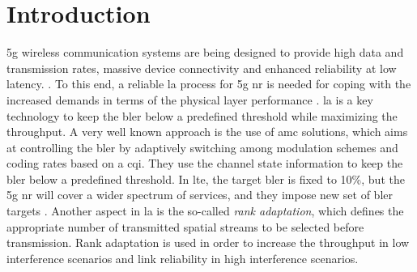 \glsresetall[\acronymtype]
%
\chapter{Introduction} \label{chp:introduction}
\Gls{5g} wireless communication systems are being designed to provide high data and transmission rates, massive device connectivity and enhanced reliability at low latency. \cite{Amin_2016}.
%
To this end, a reliable \gls{la} process for \gls{5g} \gls{nr} is needed for coping with the increased demands in terms of the physical layer performance \cite{chu01}.
%
\Gls{la} is a key technology to keep the \gls{bler} below a predefined threshold while maximizing the throughput.
%
%
%
A very well known approach is the use of \gls{amc} solutions, which aims at controlling the \gls{bler} by adaptively switching among modulation schemes and coding rates based on a \gls{cqi}.
%
They use the channel state information to keep the \gls{bler} below a predefined threshold.
%
In \gls{lte}, the target \gls{bler} is fixed to 10\%, but the \gls{5g} \gls{nr} will cover a wider spectrum of services, and they impose new set of \gls{bler} targets \cite{Amin_2016,fantacci2009adaptive}.
%
Another aspect in \gls{la} is the so-called \textit{rank adaptation}, which defines the appropriate number of transmitted spatial streams to be selected before transmission.
%
Rank adaptation is used in order to increase the throughput in low interference scenarios and link reliability in high interference scenarios.

%
%

